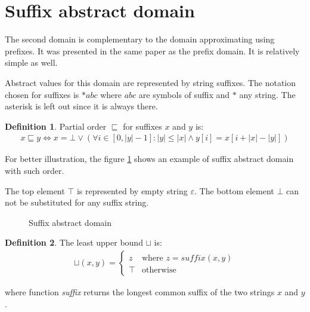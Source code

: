 \documentclass[12pt,final,oneside]{fithesis2}
\theoremstyle{definition}
\newtheorem{definition}{Definition}[chapter]
\begin{document}
\section{Suffix abstract domain}

The second domain is complementary to the domain approximating using
prefixes. It was presented in the same paper \cite{Constantini11-1} as the
prefix domain. It is relatively simple as well.

Abstract values for this domain are represented by string suffixes.
The notation chosen for suffixes is $*abc$ where $abc$ are symbols of
suffix and $*$ any string. The asterisk is left out since it is always
there.

\begin{definition}
Partial order $\sqsubseteq$ for suffixes $x$ and $y$ is:
\begin{align*}
x \sqsubseteq y \Leftrightarrow
  x = \bot \lor (\forall i \in [0, |y| - 1] : |y| \leq |x| \land
    y[i] = x[i + |x| - |y|])
\end{align*}
\end{definition}

For better illustration, the figure \ref{fig:suffixlattice} shows an
example of suffix abstract domain with such order.

The top element $\top$ is represented by empty string $\varepsilon$. The bottom
element $\bot$ can not be substituted for any suffix string.

\begin{figure}[h]
\centering
{}
\caption{Suffix abstract domain}
\label{fig:suffixlattice}
\end{figure}

\begin{definition}
\label{def:suffixjoin}
The least upper bound $\sqcup$ is:
\begin{align*}
\sqcup (x, y) =
\begin{cases}
z    & \text{where } z = \textit{suffix}(x,  y) \\
\top & \text{otherwise}
\end{cases}
\end{align*}

where function \textit{suffix} returns the longest common suffix of the
two strings $x$ and $y$.
\end{definition}
\end{document}
